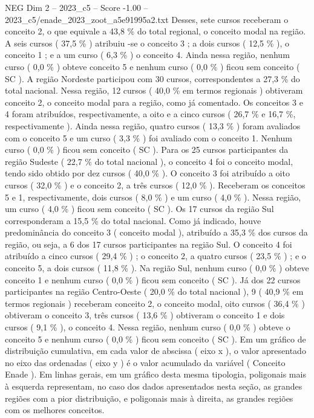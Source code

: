 \begin{textsample}{NEG Dim 2 – 2023\_c5 – Score -1.00 – 2023\_c5/enade\_2023\_zoot\_a5e91995a2.txt}
Desses, sete cursos receberam o conceito 2, o que equivale a 43,8 \% do total regional, o conceito modal na região.
A seis cursos ( 37,5 \% ) atribuiu -se o conceito 3 ; a dois cursos ( 12,5 \% ), o conceito 1 ; e a um curso ( 6,3 \% ) o conceito 4.
Ainda nessa região, nenhum curso ( 0,0 \% ) obteve conceito 5 e nenhum curso ( 0,0 \% ) ficou sem conceito ( SC ).
A região Nordeste participou com 30 cursos, correspondentes a 27,3 \% do total nacional.
Nessa região, 12 cursos ( 40,0 \% em termos regionais ) obtiveram conceito 2, o conceito modal para a região, como já comentado.
Os conceitos 3 e 4 foram atribuídos, respectivamente, a oito e a cinco cursos ( 26,7 \% e 16,7 \%, respectivamente ).
Ainda nessa região, quatro cursos ( 13,3 \% ) foram avaliados com o conceito 5 e um curso ( 3,3 \% ) foi avaliado com o conceito 1.
Nenhum curso ( 0,0 \% ) ficou sem conceito ( SC ).
Para os 25 cursos participantes da região Sudeste ( 22,7 \% do total nacional ), o conceito 4 foi o conceito modal, tendo sido obtido por dez cursos ( 40,0 \% ).
O conceito 3 foi atribuído a oito cursos ( 32,0 \% ) e o conceito 2, a três cursos ( 12,0 \% ).
Receberam os conceitos 5 e 1, respectivamente, dois cursos ( 8,0 \% ) e um curso ( 4,0 \% ).
Nessa região, um curso ( 4,0 \% ) ficou sem conceito ( SC ).
Os 17 cursos da região Sul corresponderam a 15,5 \% do total nacional.
Como já indicado, houve predominância do conceito 3 ( conceito modal ), atribuído a 35,3 \% dos cursos da região, ou seja, a 6 dos 17 cursos participantes na região Sul.
O conceito 4 foi atribuído a cinco cursos ( 29,4 \% ) ; o conceito 2, a quatro cursos ( 23,5 \% ) ; e o conceito 5, a dois cursos ( 11,8 \% ).
Na região Sul, nenhum curso ( 0,0 \% ) obteve conceito 1 e nenhum curso ( 0,0 \% ) ficou sem conceito ( SC ).
Já dos 22 cursos participantes na região Centro-Oeste ( 20,0 \% do total nacional ), 9 ( 40,9 \% em termos regionais ) receberam conceito 2, o conceito modal, oito cursos ( 36,4 \% ) obtiveram o conceito 3, três cursos ( 13,6 \% ) obtiveram o conceito 1 e dois cursos ( 9,1 \% ), o conceito 4.
Nessa região, nenhum curso ( 0,0 \% ) obteve o conceito 5 e nenhum curso ( 0,0 \% ) ficou sem conceito ( SC ).
Em um gráfico de distribuição cumulativa, em cada valor de abscissa ( eixo x ), o valor apresentado no eixo das ordenadas ( eixo y ) é o valor acumulado da variável ( Conceito Enade ).
Em linhas gerais, em um gráfico desta mesma tipologia, poligonais mais à esquerda representam, no caso dos dados apresentados nesta seção, as grandes regiões com a pior distribuição, e poligonais mais à direita, as grandes regiões com os melhores conceitos.

\end{textsample}
